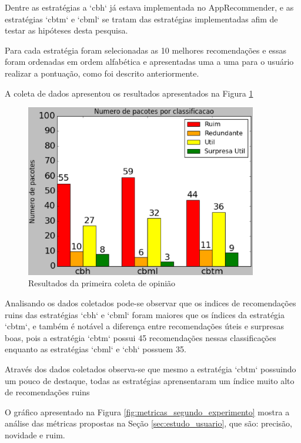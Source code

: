 Dentre as estratégias a `cbh` já estava implementada no AppRecommender, e as
estratégias `cbtm` e `cbml` se tratam das estratégias implementadas afim de
testar as hipóteses desta pesquisa.

Para cada estratégia foram selecionadas as 10 melhores recomendações
e essas foram ordenadas em ordem alfabética e apresentadas uma a uma para
o usuário realizar a pontuação, como foi descrito anteriormente.

A coleta de dados apresentou os resultados apresentados na Figura
\ref{fig:primeiro_experimento}

\pagebreak

\begin{figure}[h]
  \centering
  \includegraphics[width=0.9\textwidth]{figuras/primeiro_experimento.eps}
  \caption{Resultados da primeira coleta de opinião}
  \label{fig:primeiro_experimento}
\end{figure}

Analisando os dados coletados pode-se observar que os indices de recomendações
ruins das estratégias `cbh` e `cbml` foram maiores que os índices da estratégia
`cbtm`, e também é notável a diferença entre recomendações úteis e surpresas
boas, pois a estratégia `cbtm` possui 45 recomendações nessas classificações
enquanto as estratégias `cbml` e `cbh` possuem 35.

Através dos dados coletados observa-se que mesmo a estratégia `cbtm` possuindo
um pouco de destaque, todas as estratégias aprensentaram um índice muito alto
de recomendações ruins

O gráfico apresentado na Figura \ref{fig:metricas_segundo_experimento} mostra
a análise das métricas propostas na Seção \ref{sec:estudo_usuario}, que são:
precisão, novidade e ruim.

